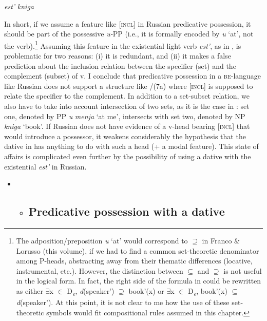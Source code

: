 \documentclass[output=paper,modfonts,nonflat]{langsci/langscibook}
\begin{document}
         \textit{est’}  \textit{kniga}

In short, if we assume a feature like [\textsc{incl}] in Russian predicative possession, it should be part of the possessive \textit{u-}PP (i.e., it is formally encoded by \textit{u} ‘at’, not the verb).\footnote{The adposition/preposition \textit{u} ‘at’ would correspond to \textrm{${\supseteq}$} in Franco \& Lorusso (this volume), if we had to find a common set-theoretic denominator among P-heads, abstracting away from their thematic differences (locative, instrumental, etc.). However, the distinction between \textrm{${\subseteq}$} and \textrm{${\supseteq}$} is not useful in the logical form. In fact, the right side of the formula in  could be rewritten as either \textrm{${\exists}$}x \textrm{${\in}$} D\textit{\textsubscript{e}}, \textit{d}(speaker\textrm{'}) \textrm{${\supseteq}$} book\textrm{'}(x) or \textrm{${\exists}$}x \textrm{${\in}$} D\textit{\textsubscript{e}}, book\textrm{'}(x) \textrm{${\subseteq}$} \textit{d}(speaker\textrm{'}). At this point, it is not clear to me how the use of these set-theoretic symbols would fit compositional rules assumed in this chapter.}  Assuming this feature in the existential light verb \textit{est’}, as in , is problematic for two reasons: (i) it is redundant, and (ii) it makes a false prediction about the inclusion relation between the specifier (set) and the complement (subset) of v. I conclude that predicative possession in a \textsc{be}{}-language like Russian does not support a structure like /(7a) where [\textsc{incl}] is supposed to relate the specifier to the complement. In addition to a set-subset relation, we also have to take into account intersection of two sets, as it is the case in : set one, denoted by PP \textit{u} \textit{menja} ‘at me’, intersects with set two, denoted by NP \textit{kniga} ‘book’. If Russian does not have evidence of a v-head bearing [\textsc{incl}] that would introduce a possessor, it weakens considerably the hypothesis that the dative in  has anything to do with such a head (+ a modal feature). This state of affairs is complicated even further by the possibility of using a dative with the existential \textit{est’} in Russian.

\begin{itemize}
\item \begin{itemize}
\item \subsection{Predicative possession with a dative}
\end{itemize}
\end{itemize}
\end{document}
